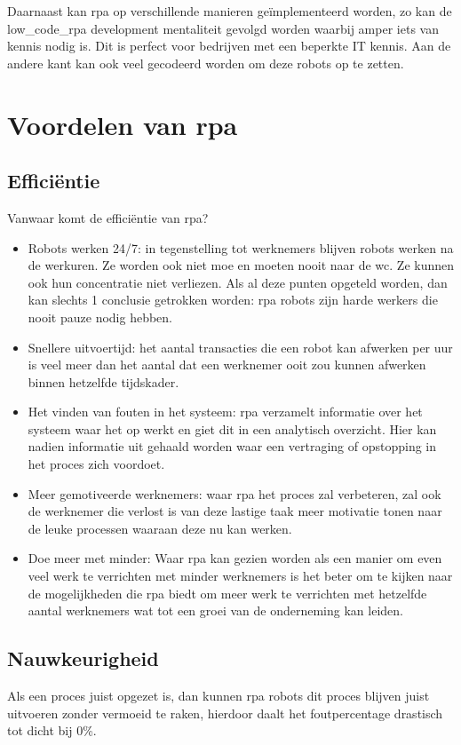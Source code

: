 Daarnaast kan \acrshort{rpa} op verschillende manieren geïmplementeerd worden, zo kan de \gls{low_code_rpa} development mentaliteit gevolgd worden waarbij amper iets van kennis nodig is. Dit is perfect voor bedrijven met een beperkte IT kennis. Aan de andere kant kan ook veel gecodeerd worden om deze robots op te zetten.
\autocite{everythingRPA}

\section{Voordelen van \acrshort{rpa}}

\subsection{Efficiëntie}
Vanwaar komt de efficiëntie van \acrshort{rpa}?
\begin{itemize}
	\item Robots werken 24/7: in tegenstelling tot werknemers blijven robots werken na de werkuren. Ze worden ook niet moe en moeten nooit naar de wc. Ze kunnen ook hun concentratie niet verliezen. Als al deze punten opgeteld worden, dan kan slechts 1 conclusie getrokken worden: \acrshort{rpa} robots zijn harde werkers die nooit pauze nodig hebben.
	\item Snellere uitvoertijd: het aantal transacties die een robot kan afwerken per uur is veel meer dan het aantal dat een werknemer ooit zou kunnen afwerken binnen hetzelfde tijdskader.
	\item Het vinden van fouten in het systeem: \acrshort{rpa} verzamelt informatie over het systeem waar het op werkt en giet dit in een analytisch overzicht. Hier kan nadien informatie uit gehaald worden waar een vertraging of opstopping in het proces zich voordoet.
	\item Meer gemotiveerde werknemers: waar \acrshort{rpa} het proces zal verbeteren, zal ook de werknemer die verlost is van deze lastige taak meer motivatie tonen naar de leuke processen waaraan deze nu kan werken.
	\item Doe meer met minder: Waar \acrshort{rpa} kan gezien worden als een manier om even veel werk te verrichten met minder werknemers is het beter om te kijken naar de mogelijkheden die \acrshort{rpa} biedt om meer werk te verrichten met hetzelfde aantal werknemers wat tot een groei van de onderneming kan leiden.
\end{itemize}

\autocite{efficiencyRPA}
\subsection{Nauwkeurigheid}
Als een proces juist opgezet is, dan kunnen \acrshort{rpa} robots dit proces blijven juist uitvoeren zonder vermoeid te raken, hierdoor daalt het foutpercentage drastisch tot dicht bij 0\%. \autocite{efficiencyRPA}

